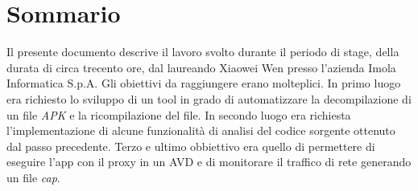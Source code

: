
\cleardoublepage
{}
{}
\begingroup
\let\clearpage\relax
\let\cleardoublepage\relax
\let\cleardoublepage\relax

\chapter*{Sommario}

Il presente documento descrive il lavoro svolto durante il periodo di stage, della durata di circa trecento ore, dal laureando Xiaowei Wen presso l'azienda Imola Informatica S.p.A. Gli obiettivi da raggiungere erano molteplici. In primo luogo era richiesto lo sviluppo di un tool in grado di automatizzare la decompilazione di un file \textit{APK} e la ricompilazione del file. In secondo luogo era richiesta l'implementazione di alcune funzionalità di analisi del codice sorgente ottenuto dal passo precedente.
Terzo e ultimo obbiettivo era quello di permettere di eseguire l'app con il proxy in un AVD e di monitorare il traffico di rete generando un file \textit{cap}.

%
%

\endgroup			

\vfill

